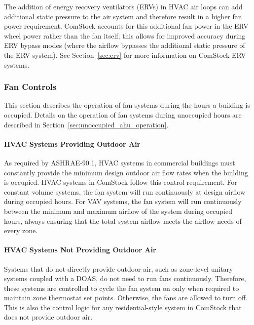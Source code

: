 The addition of energy recovery ventilators (ERVs) in HVAC air loops can add additional static pressure to the air system and therefore result in a higher fan power requirement. ComStock accounts for this additional fan power in the ERV wheel power rather than the fan itself; this allows for improved accuracy during ERV bypass modes (where the airflow bypasses the additional static pressure of the ERV system). See Section~\ref{sec:erv} for more information on ComStock ERV systems.




\subsubsection{Fan Controls}

This section describes the operation of fan systems during the hours a building is occupied. Details on the operation of fan systems during unoccupied hours are described in Section~\ref{sec:unoccupied_ahu_operation}.

\paragraph{HVAC Systems Providing Outdoor Air}

As required by ASHRAE-90.1, HVAC systems in commercial buildings must constantly provide the minimum design outdoor air flow rates when the building is occupied. HVAC systems in ComStock follow this control requirement. For constant volume systems, the fan system will run continuously at design airflow during occupied hours. For VAV systems, the fan system will run continuously between the minimum and maximum airflow of the system during occupied hours, always ensuring that the total system airflow meets the airflow needs of every zone.

\paragraph{HVAC Systems Not Providing Outdoor Air}

Systems that do not directly provide outdoor air, such as zone-level unitary systems coupled with a DOAS, do not need to run fans continuously. Therefore, these systems are controlled to cycle the fan system on only when required to maintain zone thermostat set points. Otherwise, the fans are allowed to turn off. This is also the control logic for any residential-style system in ComStock that does not provide outdoor air.


